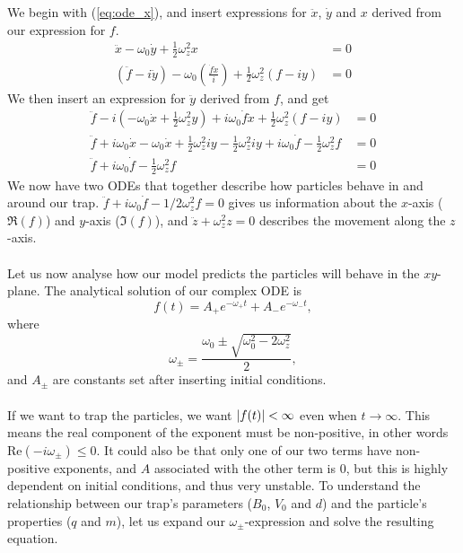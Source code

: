 %
We begin with (\ref{eq:ode_x}), and insert expressions for $\ddot x$, $\dot y$ and $x$ derived from our expression for $f$.
%
\begin{align*}
\ddot x - \omega_0 \dot y + \frac{1}{2} \omega_z^2 x &= 0 \\
\left( \ddot f - i \ddot y \right) - \omega_0 \left( \frac{\dot f \dot x}{i} \right) + \frac{1}{2} \omega_z^2 \left( f - iy \right) &= 0
\end{align*}
%
We then insert an expression for $\ddot y$ derived from $f$, and get
%
\begin{align*}
\ddot f - i \left( - \omega_0 \dot x + \frac{1}{2} \omega_z^2 y \right) + i \omega_0 \dot f \dot x + \frac{1}{2} \omega_z^2 \left( f - iy \right) &= 0 \\
\ddot f + i \omega_0 \dot x - \omega_0 \dot x + \frac{1}{2} \omega_z^2 i y - \frac{1}{2} \omega_z^2 i y + i \omega_0 \dot f - \frac{1}{2} \omega_z^2 f &= 0 \\
\ddot f + i \omega_0 \dot f - \frac{1}{2} \omega_z^2 f &= 0
\end{align*}
%
We now have two ODEs that together describe how particles behave in and around our trap. $\ddot f + i \omega_0 \dot f - 1/2 \omega_z^2 f = 0$ gives us information about the $x$-axis ($\Re(f)$) and $y$-axis ($\Im(f)$), and $\ddot z + \omega_z^2 z = 0$ describes the movement along the $z$-axis.
\\\\
Let us now analyse how our model predicts the particles will behave in the $xy$-plane. The analytical solution of our complex ODE is 
%
\begin{equation}
f(t) = A_+e^{-\omega_+ t} + A_-e^{-\omega_- t},
\label{eq:analytical_solution_xy}
\end{equation}
%
where
\begin{equation*}
\omega_\pm = \frac{\omega_0 \pm \sqrt{\omega_0^2 - 2 \omega_z^2}}{2},
\end{equation*}
and $A_\pm$ are constants set after inserting initial conditions.
\\\\
If we want to trap the particles, we want $\abs{f(t)} < \infty$ even when $t \to \infty$. This means the real component of the exponent must be non-positive, in other words $\text{Re}(-i\omega_\pm) \leq 0$. It could also be that only one of our two terms have non-positive exponents, and $A$ associated with the other term is $0$, but this is highly dependent on initial conditions, and thus very unstable. To understand the relationship between our trap's parameters ($B_0$, $V_0$ and $d$) and the particle's properties ($q$ and $m$), let us expand our $\omega_\pm$-expression and solve the resulting equation.
